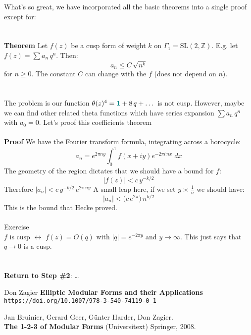 \documentclass[12pt]{article}
\begin{document}
\noindent What's so great, we have incorporated all the basic theorems into a single proof except for: \\ \\ \\
\textbf{Theorem }Let $f(z)$ be a cusp form of weight $k$ on $\Gamma_1 = \mathrm{SL}(2, \mathbb{Z})$.  E.g. let $f(z) = \sum a_n \, q^n$.  Then:
$$ a_n \leq C \, \sqrt{n^k}  $$
for $n \geq 0$.  The constant $C$ can change with the $f$ (does not depend on $n$). \\ \\ \\
The problem is our function $\theta(z)^4 = {\color{green!50!blue}\mathbf{1}} + 8 \, q + \dots $ is not cusp.  However, maybe we can find other related theta functions which have series expansion $\sum a_n \, q^n$ with $a_0 = 0$.  Let's proof this coefficients theorem \\ \\
\textbf{Proof} We have the Fourier transform formula, integrating across a horocycle:
$$ a_n = e^{2\pi n y} \int_0^1 f(x + iy) e^{- 2\pi i \, n x} \; dx  $$
The geometry of the region dictates that we should have a bound for $f$:
$$ \big|f(z)\big| < c \, y^{-k/2} $$
Therefore $|a_n| <  c  \, y^{-k/2} \, e^{2\pi \ ny } $ A small leap here, if we set $y \asymp \frac{1}{n}$ we should have:
$$ |a_n| < \big( c \, e^{2\pi} \big) \, n^{k/2} $$
This is the bound that Hecke proved. \\ \\
{\color{red!50!green}Exercise} \\ 
$f$ is cusp $\leftrightarrow$ $f(z) = O(q)$ with $|q| = e^{-2\pi y }$ and $y \to \infty$.  \hfill This just says that $q \to 0$ is a cusp. \\ \\ \\
\textbf{Return to Step \#2}: \dots
\vfill

\begin{thebibliography}{}


\item Don Zagier \textbf{Elliptic Modular Forms and their Applications} \\ \texttt{https://doi.org/10.1007/978-3-540-74119-0\_1}

\item Jan Bruinier, Gerard Geer, G\"{u}nter Harder, Don Zagier. \\ \textbf{The 1-2-3 of Modular Forms} (Universitext) Springer, 2008.


\end{thebibliography}
\end{document}
